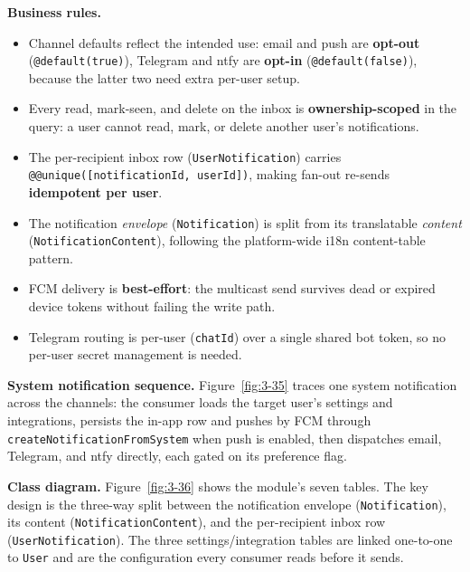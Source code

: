 \textbf{Business rules.}
\begin{itemize}
  \item Channel defaults reflect the intended use: email and push are \textbf{opt-out}
    (\texttt{@default(true)}), Telegram and ntfy are \textbf{opt-in} (\texttt{@default(false)}),
    because the latter two need extra per-user setup.
  \item Every read, mark-seen, and delete on the inbox is \textbf{ownership-scoped} in the
    query: a user cannot read, mark, or delete another user's notifications.
  \item The per-recipient inbox row (\texttt{UserNotification}) carries
    \texttt{@@unique([notificationId, userId])}, making fan-out re-sends \textbf{idempotent
    per user}.
  \item The notification \emph{envelope} (\texttt{Notification}) is split from its
    translatable \emph{content} (\texttt{NotificationContent}), following the platform-wide
    i18n content-table pattern.
  \item FCM delivery is \textbf{best-effort}: the multicast send survives dead or expired
    device tokens without failing the write path.
  \item Telegram routing is per-user (\texttt{chatId}) over a single shared bot token, so no
    per-user secret management is needed.
\end{itemize}


\textbf{System notification sequence.} Figure~\ref{fig:3-35} traces one system notification
across the channels: the consumer loads the target user's settings and integrations, persists
the in-app row and pushes by FCM through \texttt{createNotificationFromSystem} when push is
enabled, then dispatches email, Telegram, and ntfy directly, each gated on its preference
flag.


\textbf{Class diagram.} Figure~\ref{fig:3-36} shows the module's seven tables. The key design
is the three-way split between the notification envelope (\texttt{Notification}), its
content (\texttt{NotificationContent}), and the per-recipient inbox row
(\texttt{UserNotification}). The three settings/integration tables are linked one-to-one to
\texttt{User} and are the configuration every consumer reads before it sends.

